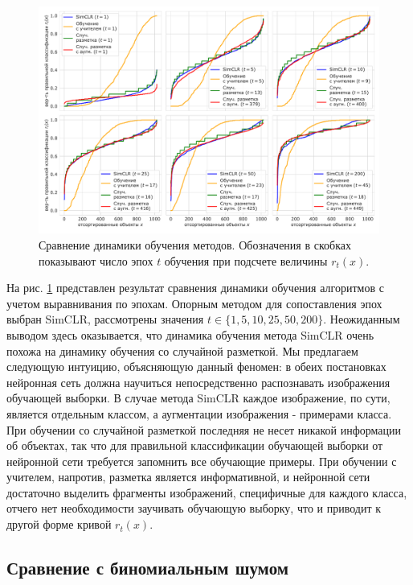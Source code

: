 \begin{figure}[H]
    \centering
    \includegraphics[width=17cm]{images/equal_areas.pdf}
    \caption{Сравнение динамики обучения методов. Обозначения в скобках показывают число эпох $t$ обучения при подсчете величины $r_t(x)$.}
    \label{experiments:pic:2}
\end{figure}{}

На рис. \ref{experiments:pic:2} представлен результат сравнения динамики обучения алгоритмов с учетом выравнивания по эпохам. Опорным методом для сопоставления эпох выбран SimCLR, рассмотрены значения $t \in \{1, 5, 10, 25, 50, 200\}$. Неожиданным выводом здесь оказывается, что динамика обучения метода SimCLR очень похожа на динамику обучения со случайной разметкой. Мы предлагаем следующую интуицию, объясняющую данный феномен: в обеих постановках нейронная сеть должна научиться непосредственно распознавать изображения обучающей выборки. В случае метода SimCLR каждое изображение, по сути, является отдельным классом, а аугментации изображения - примерами класса. При обучении со случайной разметкой последняя не несет никакой информации об объектах, так что для правильной классификации обучающей выборки от нейронной сети требуется запомнить все обучающие примеры. При обучении с учителем, напротив, разметка является информативной, и нейронной сети достаточно выделить фрагменты изображений, специфичные для каждого класса, отчего нет необходимости заучивать обучающую выборку, что и приводит к другой форме кривой $r_t(x)$.

\subsection{Сравнение с биномиальным шумом}
\label{experiments:1}

